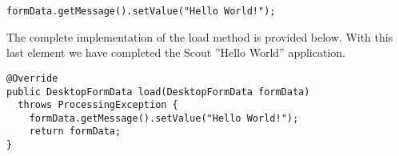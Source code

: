 \begin{lstlisting}[backgroundcolor=\color{white}]
formData.getMessage().setValue("Hello World!");
\end{lstlisting}

The complete implementation of the load method is provided below.
With this last element we have completed the Scout ''Hello World'' application.

\begin{lstlisting}
@Override
public DesktopFormData load(DesktopFormData formData) 
  throws ProcessingException {
    formData.getMessage().setValue("Hello World!"); 
    return formData;
}
\end{lstlisting}

